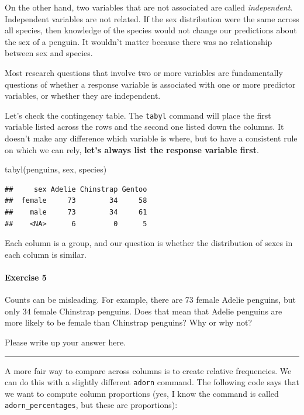 \documentclass[
]{book}
\newenvironment{Shaded}{\begin{snugshade}}{\end{snugshade}}
\newcommand{\FunctionTok}[1]{\textcolor[rgb]{0.00,0.00,0.00}{#1}}
\newcommand{\NormalTok}[1]{#1}
\begin{document}
On the other hand, two variables that are not associated are called \emph{independent}. Independent variables are not related. If the sex distribution were the same across all species, then knowledge of the species would not change our predictions about the sex of a penguin. It wouldn't matter because there was no relationship between sex and species.

Most research questions that involve two or more variables are fundamentally questions of whether a response variable is associated with one or more predictor variables, or whether they are independent.

Let's check the contingency table. The \texttt{tabyl} command will place the first variable listed across the rows and the second one listed down the columns. It doesn't make any difference which variable is where, but to have a consistent rule on which we can rely, \textbf{let's always list the response variable first}.

\begin{Shaded}
\begin{Highlighting}[]
\FunctionTok{tabyl}\NormalTok{(penguins, sex, species)}
\end{Highlighting}
\end{Shaded}

\begin{verbatim}
##     sex Adelie Chinstrap Gentoo
##  female     73        34     58
##    male     73        34     61
##    <NA>      6         0      5
\end{verbatim}

Each column is a group, and our question is whether the distribution of sexes in each column is similar.

\hypertarget{exercise-5}{%
\paragraph*{Exercise 5}\label{exercise-5}}

Counts can be misleading. For example, there are 73 female Adelie penguins, but only 34 female Chinstrap penguins. Does that mean that Adelie penguins are more likely to be female than Chinstrap penguins? Why or why not?

Please write up your answer here.

\begin{center}\rule{0.5\linewidth}{0.5pt}\end{center}

A more fair way to compare across columns is to create relative frequencies. We can do this with a slightly different \texttt{adorn} command. The following code says that we want to compute column proportions (yes, I know the command is called \texttt{adorn\_percentages}, but these are proportions):
\end{document}
